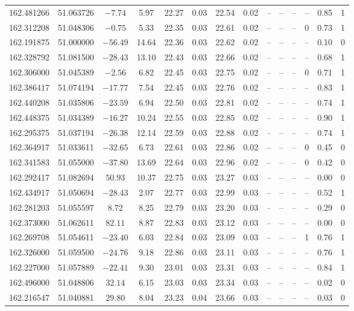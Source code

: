 \begin{tabular}{ccccccccccccc}
162.481266 & 51.063726 & $-7.74$ & 5.97 & 22.27 & 0.03 & 22.54 & 0.02 & -- & -- & -- & -- & 0.85 & 1 \\
162.312208 & 51.048306 & $-0.75$ & 5.33 & 22.35 & 0.03 & 22.61 & 0.02 & -- & -- & -- & 0 & 0.73 & 1 \\
162.191875 & 51.000000 & $-56.49$ & 14.64 & 22.36 & 0.03 & 22.62 & 0.02 & -- & -- & -- & -- & 0.10 & 0 \\
162.328792 & 51.081500 & $-28.43$ & 13.10 & 22.43 & 0.03 & 22.66 & 0.02 & -- & -- & -- & -- & 0.68 & 1 \\
162.306000 & 51.045389 & $-2.56$ & 6.82 & 22.45 & 0.03 & 22.75 & 0.02 & -- & -- & -- & 0 & 0.71 & 1 \\
162.386417 & 51.074194 & $-17.77$ & 7.54 & 22.45 & 0.03 & 22.76 & 0.02 & -- & -- & -- & -- & 0.83 & 1 \\
162.440208 & 51.035806 & $-23.59$ & 6.94 & 22.50 & 0.03 & 22.81 & 0.02 & -- & -- & -- & -- & 0.74 & 1 \\
162.448375 & 51.034389 & $-16.27$ & 10.24 & 22.55 & 0.03 & 22.85 & 0.02 & -- & -- & -- & -- & 0.90 & 1 \\
162.295375 & 51.037194 & $-26.38$ & 12.14 & 22.59 & 0.03 & 22.88 & 0.02 & -- & -- & -- & -- & 0.74 & 1 \\
162.364917 & 51.033611 & $-32.65$ & 6.73 & 22.61 & 0.03 & 22.86 & 0.02 & -- & -- & -- & 0 & 0.45 & 0 \\
162.341583 & 51.055000 & $-37.80$ & 13.69 & 22.64 & 0.03 & 22.96 & 0.02 & -- & -- & -- & 0 & 0.42 & 0 \\
162.292417 & 51.082694 & $50.93$ & 10.37 & 22.75 & 0.03 & 23.27 & 0.03 & -- & -- & -- & -- & 0.00 & 0 \\
162.434917 & 51.050694 & $-28.43$ & 2.07 & 22.77 & 0.03 & 22.99 & 0.03 & -- & -- & -- & -- & 0.52 & 1 \\
162.281203 & 51.055597 & $8.72$ & 8.25 & 22.79 & 0.03 & 23.20 & 0.03 & -- & -- & -- & -- & 0.29 & 0 \\
162.373000 & 51.062611 & $82.11$ & 8.87 & 22.83 & 0.03 & 23.12 & 0.03 & -- & -- & -- & -- & 0.00 & 0 \\
162.269708 & 51.054611 & $-23.40$ & 6.03 & 22.84 & 0.03 & 23.09 & 0.03 & -- & -- & -- & 1 & 0.76 & 1 \\
162.326000 & 51.059500 & $-24.76$ & 9.18 & 22.86 & 0.03 & 23.11 & 0.03 & -- & -- & -- & -- & 0.76 & 1 \\
162.227000 & 51.057889 & $-22.41$ & 9.30 & 23.01 & 0.03 & 23.31 & 0.03 & -- & -- & -- & -- & 0.84 & 1 \\
162.496000 & 51.048806 & $32.14$ & 6.15 & 23.03 & 0.03 & 23.34 & 0.03 & -- & -- & -- & -- & 0.02 & 0 \\
162.216547 & 51.040881 & $29.80$ & 8.04 & 23.23 & 0.04 & 23.66 & 0.03 & -- & -- & -- & -- & 0.03 & 0 \\
\bottomrule
\end{tabular}
